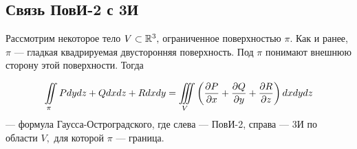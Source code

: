 \documentclass[../../main.tex]{subfiles}
\begin{document}
\subsection{Связь ПовИ-2 с 3И}

Рассмотрим некоторое тело $V\subset \mathbb{R}^3,$ ограниченное поверхностью $\pi.$ 
Как и ранее, $\pi$ --- гладкая квадрируемая двусторонняя поверхность. 
Под $\pi$ понимают внешнюю сторону этой поверхности. Тогда 

\begin{equation}\label{lec24, num_3}
\iint\limits_\pi Pdydz +  Qdxdz + Rdxdy = \iiint\limits_V \left(\frac{\partial P}{\partial x}
  + \frac{\partial Q}{\partial y} + \frac{\partial R}{\partial z}\right) dxdydz\end{equation} --- формула
   Гаусса-Остроградского, где слева --- ПовИ-2, справа --- 3И по области $V,$
    для которой $\pi$ --- граница.
\end{document}

